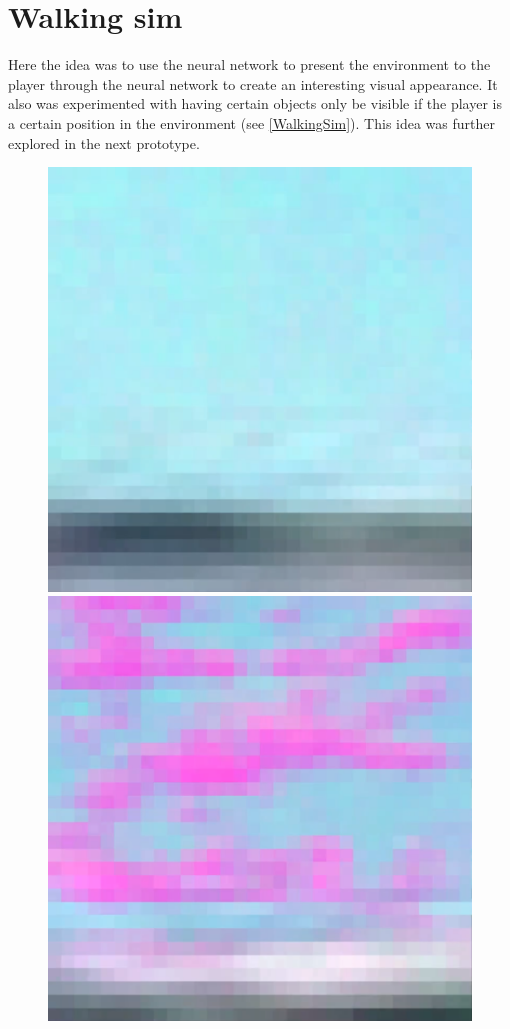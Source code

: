 \section{Walking sim}
Here the idea was to use the neural network to present the environment to the player through the neural network to create an interesting visual appearance. It also was experimented with having certain objects only be visible if the player is a certain position in the environment (see \cref{WalkingSim}). This idea was further explored in the next prototype.

\begin{figure}[p]
  \centering
  \includegraphics[width=\imgWidth]{images/workflow/WalkingSimNothing.png} \\[\picVdist]
  \includegraphics[width=\imgWidth]{images/workflow/WalkingSimCloud.png}

\end{figure}
